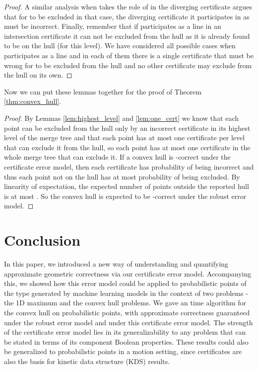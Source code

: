 \documentclass[11pt]{article}
\begin{document}
\begin{proof}
A similar analysis when  takes the role of  in the diverging certificate argues that for  to be excluded in that case, the diverging certificate it participates in as  must be incorrect.  Finally, remember that if  participates as a line in an intersection certificate it can not be excluded from the hull as it is already found to be on the hull (for this level).  We have considered all possible cases when  participates as a line and in each of them there is a single certificate that must be wrong for  to be excluded from the hull and no other certificate may exclude  from the hull on its own.
\end{proof}

Now we can put these lemmas together for the proof of Theorem \ref{thm:convex_hull}.

\begin{proof}
By Lemmas \ref{lem:highest_level} and \ref{lem:one_cert} we know that each point can be excluded from the hull only by an incorrect certificate in its highest level of the merge tree and that each point has at most one certificate per level that can exclude it from the hull, so each point has at most one certificate in the whole merge tree that can exclude it.  If a convex hull is -correct under the certificate error model, then each certificate has  probability of being incorrect and thus each point not on the hull has at most  probability of being excluded.  
By linearity of expectation, the expected number of points outside the reported hull is at most .  So the convex hull is expected to be -correct under the robust error model.
\end{proof}


\section{Conclusion}
In this paper, we introduced a new way of understanding and quantifying approximate geometric correctness via our certificate error model.  Accompanying this, we showed how this error model could be applied to probabilistic points of the type generated by machine learning models in the context of two problems - the 1D maximum and the convex hull problems.  We gave an  time algorithm for the convex hull on probabilistic points, with approximate correctness guaranteed under the robust error model and under this certificate error model.  The strength of the certificate error model lies in its generalizability to any problem that can be stated in terms of its component Boolean properties.  These results could also be generalized to probabilistic points in a motion setting, since certificates are also the basis for kinetic data structure (KDS) results.




\end{document}
